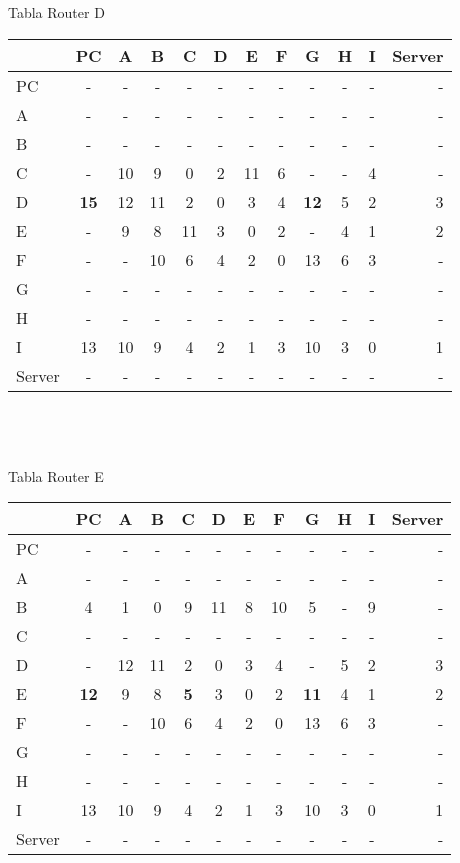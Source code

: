 \documentclass{article}
\begin{document}
\\
\\
Tabla Router D	 \\
\begin{tabular}{l*{10}{c}r}
              & PC & A & B & C & D & E & F & G & H & I & Server \\
\hline
PC             & - & - & - & - & - & - & - & - & - & - & -\\
A              & - & - & - & - & - & - & - & - & - & - & -\\
B              & - & - & - & - & - & - & - & - & - & - & -\\
C              & - & 10 & 9 & 0 & 2 & 11 & 6 & - & - & 4 & -\\
D              &\bf{15}& 12 & 11 & 2 & 0 & 3 & 4 &\bf{12}& 5 & 2 & 3\\
E              & - & 9 & 8 & 11 & 3 & 0 & 2 & - & 4 & 1 & 2\\
F              & - & - & 10 & 6 & 4 & 2 & 0 & 13 & 6 & 3 & -\\
G              & - & - & - & - & - & - & - & - & - & - & -\\
H              & - & - & - & - & - & - & - & - & - & - & -\\
I              & 13 & 10 & 9 & 4 & 2 & 1 & 3 & 10 & 3 & 0 & 1\\
Server         & - & - & - & - & - & - & - & - & - & - & -\\

\end{tabular}\\
\\
\\
Tabla Router E \\
\begin{tabular}{l*{10}{c}r}
              & PC & A & B & C & D & E & F & G & H & I & Server \\
\hline
PC             & - & - & - & - & - & - & - & - & - & - & -\\
A              & - & - & - & - & - & - & - & - & - & - & -\\
B              & 4 & 1 & 0 & 9 & 11	& 8 & 10 & 5 & - & 9 & -\\
C              & - & - & - & - & - & - & - & - & - & - & -\\
D              & - & 12 & 11 & 2 & 0 & 3 & 4 & - & 5 & 2 & 3\\
E              &\bf{12}& 9 & 8 &\bf{5}& 3 & 0 & 2 &\bf{11}& 4 & 1 & 2\\
F              & - & - & 10 & 6 & 4 & 2 & 0 & 13 & 6 & 3 & -\\
G              & - & - & - & - & - & - & - & - & - & - & -\\
H              & - & - & - & - & - & - & - & - & - & - & -\\
I              & 13 & 10 & 9 & 4 & 2 & 1 & 3 & 10 & 3 & 0 & 1\\
Server         & - & - & - & - & - & - & - & - & - & - & -\\

\end{tabular}
\end{document}
